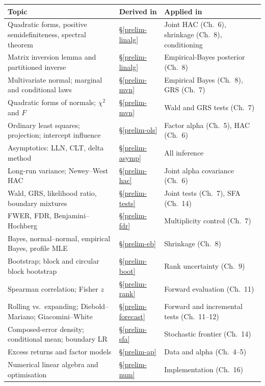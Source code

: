 \begin{longtable}[]{@{}p{}p{}p{}@{}}
\toprule\noalign{}
Topic & Derived in & Applied in \\
\midrule\noalign{}
\endhead
\bottomrule\noalign{}
\endlastfoot
Quadratic forms, positive semidefiniteness, spectral theorem & \S\ref{prelim-linalg} & Joint HAC (Ch.~6), shrinkage (Ch.~8), conditioning \\
Matrix inversion lemma and partitioned inverse & \S\ref{prelim-linalg} & Empirical-Bayes posterior (Ch.~8) \\
Multivariate normal; marginal and conditional laws & \S\ref{prelim-mvn} & Empirical Bayes (Ch.~8), GRS (Ch.~7) \\
Quadratic forms of normals; $\chi^2$ and $F$ & \S\ref{prelim-mvn} & Wald and GRS tests (Ch.~7) \\
Ordinary least squares; projection; intercept influence & \S\ref{prelim-ols} & Factor alpha (Ch.~5), HAC (Ch.~6) \\
Asymptotics: LLN, CLT, delta method & \S\ref{prelim-asymp} & All inference \\
Long-run variance; Newey--West HAC & \S\ref{prelim-hac} & Joint alpha covariance (Ch.~6) \\
Wald, GRS, likelihood ratio, boundary mixtures & \S\ref{prelim-tests} & Joint tests (Ch.~7), SFA (Ch.~14) \\
FWER, FDR, Benjamini--Hochberg & \S\ref{prelim-fdr} & Multiplicity control (Ch.~7) \\
Bayes, normal--normal, empirical Bayes, profile MLE & \S\ref{prelim-eb} & Shrinkage (Ch.~8) \\
Bootstrap; block and circular block bootstrap & \S\ref{prelim-boot} & Rank uncertainty (Ch.~9) \\
Spearman correlation; Fisher $z$ & \S\ref{prelim-rank} & Forward evaluation (Ch.~11) \\
Rolling vs.\ expanding; Diebold--Mariano; Giacomini--White & \S\ref{prelim-forecast} & Forward and incremental tests (Ch.~11--12) \\
Composed-error density; conditional mean; boundary LR & \S\ref{prelim-sfa} & Stochastic frontier (Ch.~14) \\
Excess returns and factor models & \S\ref{prelim-ap} & Data and alpha (Ch.~4--5) \\
Numerical linear algebra and optimisation & \S\ref{prelim-num} & Implementation (Ch.~16) \\
\end{longtable}

